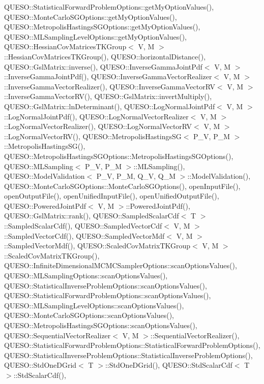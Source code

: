 Q\-U\-E\-S\-O\-::\-Statistical\-Forward\-Problem\-Options\-::get\-My\-Option\-Values(), Q\-U\-E\-S\-O\-::\-Monte\-Carlo\-S\-G\-Options\-::get\-My\-Option\-Values(), Q\-U\-E\-S\-O\-::\-Metropolis\-Hastings\-S\-G\-Options\-::get\-My\-Option\-Values(), Q\-U\-E\-S\-O\-::\-M\-L\-Sampling\-Level\-Options\-::get\-My\-Option\-Values(), Q\-U\-E\-S\-O\-::\-Hessian\-Cov\-Matrices\-T\-K\-Group$<$ V, M $>$\-::\-Hessian\-Cov\-Matrices\-T\-K\-Group(), Q\-U\-E\-S\-O\-::horizontal\-Distance(), Q\-U\-E\-S\-O\-::\-Gsl\-Matrix\-::inverse(), Q\-U\-E\-S\-O\-::\-Inverse\-Gamma\-Joint\-Pdf$<$ V, M $>$\-::\-Inverse\-Gamma\-Joint\-Pdf(), Q\-U\-E\-S\-O\-::\-Inverse\-Gamma\-Vector\-Realizer$<$ V, M $>$\-::\-Inverse\-Gamma\-Vector\-Realizer(), Q\-U\-E\-S\-O\-::\-Inverse\-Gamma\-Vector\-R\-V$<$ V, M $>$\-::\-Inverse\-Gamma\-Vector\-R\-V(), Q\-U\-E\-S\-O\-::\-Gsl\-Matrix\-::invert\-Multiply(), Q\-U\-E\-S\-O\-::\-Gsl\-Matrix\-::ln\-Determinant(), Q\-U\-E\-S\-O\-::\-Log\-Normal\-Joint\-Pdf$<$ V, M $>$\-::\-Log\-Normal\-Joint\-Pdf(), Q\-U\-E\-S\-O\-::\-Log\-Normal\-Vector\-Realizer$<$ V, M $>$\-::\-Log\-Normal\-Vector\-Realizer(), Q\-U\-E\-S\-O\-::\-Log\-Normal\-Vector\-R\-V$<$ V, M $>$\-::\-Log\-Normal\-Vector\-R\-V(), Q\-U\-E\-S\-O\-::\-Metropolis\-Hastings\-S\-G$<$ P\-\_\-\-V, P\-\_\-\-M $>$\-::\-Metropolis\-Hastings\-S\-G(), Q\-U\-E\-S\-O\-::\-Metropolis\-Hastings\-S\-G\-Options\-::\-Metropolis\-Hastings\-S\-G\-Options(), Q\-U\-E\-S\-O\-::\-M\-L\-Sampling$<$ P\-\_\-\-V, P\-\_\-\-M $>$\-::\-M\-L\-Sampling(), Q\-U\-E\-S\-O\-::\-Model\-Validation$<$ P\-\_\-\-V, P\-\_\-\-M, Q\-\_\-\-V, Q\-\_\-\-M $>$\-::\-Model\-Validation(), Q\-U\-E\-S\-O\-::\-Monte\-Carlo\-S\-G\-Options\-::\-Monte\-Carlo\-S\-G\-Options(), open\-Input\-File(), open\-Output\-File(), open\-Unified\-Input\-File(), open\-Unified\-Output\-File(), Q\-U\-E\-S\-O\-::\-Powered\-Joint\-Pdf$<$ V, M $>$\-::\-Powered\-Joint\-Pdf(), Q\-U\-E\-S\-O\-::\-Gsl\-Matrix\-::rank(), Q\-U\-E\-S\-O\-::\-Sampled\-Scalar\-Cdf$<$ T $>$\-::\-Sampled\-Scalar\-Cdf(), Q\-U\-E\-S\-O\-::\-Sampled\-Vector\-Cdf$<$ V, M $>$\-::\-Sampled\-Vector\-Cdf(), Q\-U\-E\-S\-O\-::\-Sampled\-Vector\-Mdf$<$ V, M $>$\-::\-Sampled\-Vector\-Mdf(), Q\-U\-E\-S\-O\-::\-Scaled\-Cov\-Matrix\-T\-K\-Group$<$ V, M $>$\-::\-Scaled\-Cov\-Matrix\-T\-K\-Group(), Q\-U\-E\-S\-O\-::\-Infinite\-Dimensional\-M\-C\-M\-C\-Sampler\-Options\-::scan\-Options\-Values(), Q\-U\-E\-S\-O\-::\-M\-L\-Sampling\-Options\-::scan\-Options\-Values(), Q\-U\-E\-S\-O\-::\-Statistical\-Inverse\-Problem\-Options\-::scan\-Options\-Values(), Q\-U\-E\-S\-O\-::\-Statistical\-Forward\-Problem\-Options\-::scan\-Options\-Values(), Q\-U\-E\-S\-O\-::\-M\-L\-Sampling\-Level\-Options\-::scan\-Options\-Values(), Q\-U\-E\-S\-O\-::\-Monte\-Carlo\-S\-G\-Options\-::scan\-Options\-Values(), Q\-U\-E\-S\-O\-::\-Metropolis\-Hastings\-S\-G\-Options\-::scan\-Options\-Values(), Q\-U\-E\-S\-O\-::\-Sequential\-Vector\-Realizer$<$ V, M $>$\-::\-Sequential\-Vector\-Realizer(), Q\-U\-E\-S\-O\-::\-Statistical\-Forward\-Problem\-Options\-::\-Statistical\-Forward\-Problem\-Options(), Q\-U\-E\-S\-O\-::\-Statistical\-Inverse\-Problem\-Options\-::\-Statistical\-Inverse\-Problem\-Options(), Q\-U\-E\-S\-O\-::\-Std\-One\-D\-Grid$<$ T $>$\-::\-Std\-One\-D\-Grid(), Q\-U\-E\-S\-O\-::\-Std\-Scalar\-Cdf$<$ T $>$\-::\-Std\-Scalar\-Cdf(), 